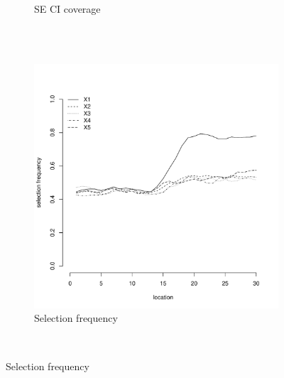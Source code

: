 \documentclass[authoryear, review, 11pt]{elsarticle}
\begin{document}
\begin{figure}
\begin{subfigure}[b]{0.45\textwidth}
		\caption{SE CI coverage}
	\end{subfigure}%
	\\%
	~ %
	\begin{subfigure}[b]{0.45\textwidth}
	\centering
		\includegraphics[width=\textwidth]{../../figures/simulation/15.27.profile_selection.pdf}
		\caption{Selection frequency}
	\end{subfigure}
	~ %

\end{figure}
\end{document}
